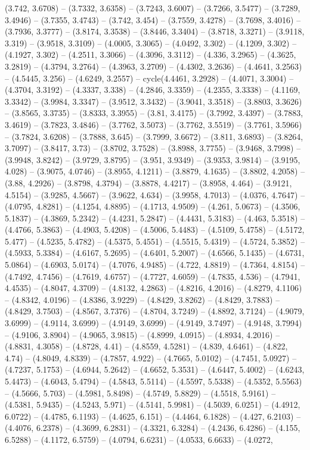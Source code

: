 (3.742, 3.6708) -- (3.7332, 3.6358) -- (3.7243, 3.6007) -- (3.7266, 3.5477) -- (3.7289, 3.4946) -- (3.7355, 3.4743) -- (3.742, 3.454) -- (3.7559, 3.4278) -- (3.7698, 3.4016) -- (3.7936, 3.3777) -- (3.8174, 3.3538) -- (3.8446, 3.3404) -- (3.8718, 3.3271) -- (3.9118, 3.319) -- (3.9518, 3.3109) -- (4.0005, 3.3065) -- (4.0492, 3.302) -- (4.1209, 3.302) -- (4.1927, 3.302) -- (4.2511, 3.3066) -- (4.3096, 3.3112) -- (4.336, 3.2965) -- (4.3625, 3.2819) -- (4.3794, 3.2764) -- (4.3963, 3.2709) -- (4.4302, 3.2636) -- (4.4641, 3.2563) -- (4.5445, 3.256) -- (4.6249, 3.2557) -- cycle(4.4461, 3.2928) -- (4.4071, 3.3004) -- (4.3704, 3.3192) -- (4.3337, 3.338) -- (4.2846, 3.3359) -- (4.2355, 3.3338) -- (4.1169, 3.3342) -- (3.9984, 3.3347) -- (3.9512, 3.3432) -- (3.9041, 3.3518) -- (3.8803, 3.3626) -- (3.8565, 3.3735) -- (3.8333, 3.3955) -- (3.81, 3.4175) -- (3.7992, 3.4397) -- (3.7883, 3.4619) -- (3.7823, 3.4846) -- (3.7762, 3.5073) -- (3.7762, 3.5519) -- (3.7761, 3.5966) -- (3.7824, 3.6208) -- (3.7888, 3.645) -- (3.7999, 3.6672) -- (3.811, 3.6893) -- (3.8264, 3.7097) -- (3.8417, 3.73) -- (3.8702, 3.7528) -- (3.8988, 3.7755) -- (3.9468, 3.7998) -- (3.9948, 3.8242) -- (3.9729, 3.8795) -- (3.951, 3.9349) -- (3.9353, 3.9814) -- (3.9195, 4.028) -- (3.9075, 4.0746) -- (3.8955, 4.1211) -- (3.8879, 4.1635) -- (3.8802, 4.2058) -- (3.88, 4.2926) -- (3.8798, 4.3794) -- (3.8878, 4.4217) -- (3.8958, 4.464) -- (3.9121, 4.5154) -- (3.9285, 4.5667) -- (3.9622, 4.634) -- (3.9958, 4.7013) -- (4.0376, 4.7647) -- (4.0795, 4.8281) -- (4.1254, 4.8895) -- (4.1713, 4.9509) -- (4.261, 5.0673) -- (4.3506, 5.1837) -- (4.3869, 5.2342) -- (4.4231, 5.2847) -- (4.4431, 5.3183) -- (4.463, 5.3518) -- (4.4766, 5.3863) -- (4.4903, 5.4208) -- (4.5006, 5.4483) -- (4.5109, 5.4758) -- (4.5172, 5.477) -- (4.5235, 5.4782) -- (4.5375, 5.4551) -- (4.5515, 5.4319) -- (4.5724, 5.3852) -- (4.5933, 5.3384) -- (4.6167, 5.2695) -- (4.6401, 5.2007) -- (4.6566, 5.1435) -- (4.6731, 5.0864) -- (4.6903, 5.0174) -- (4.7076, 4.9485) -- (4.722, 4.8819) -- (4.7364, 4.8154) -- (4.7492, 4.7456) -- (4.7619, 4.6757) -- (4.7727, 4.6059) -- (4.7835, 4.536) -- (4.7941, 4.4535) -- (4.8047, 4.3709) -- (4.8132, 4.2863) -- (4.8216, 4.2016) -- (4.8279, 4.1106) -- (4.8342, 4.0196) -- (4.8386, 3.9229) -- (4.8429, 3.8262) -- (4.8429, 3.7883) -- (4.8429, 3.7503) -- (4.8567, 3.7376) -- (4.8704, 3.7249) -- (4.8892, 3.7124) -- (4.9079, 3.6999) -- (4.9114, 3.6999) -- (4.9149, 3.6999) -- (4.9149, 3.7497) -- (4.9148, 3.7994) -- (4.9106, 3.8904) -- (4.9065, 3.9815) -- (4.8999, 4.0915) -- (4.8934, 4.2016) -- (4.8831, 4.3058) -- (4.8728, 4.41) -- (4.8559, 4.5281) -- (4.839, 4.6461) -- (4.822, 4.74) -- (4.8049, 4.8339) -- (4.7857, 4.922) -- (4.7665, 5.0102) -- (4.7451, 5.0927) -- (4.7237, 5.1753) -- (4.6944, 5.2642) -- (4.6652, 5.3531) -- (4.6447, 5.4002) -- (4.6243, 5.4473) -- (4.6043, 5.4794) -- (4.5843, 5.5114) -- (4.5597, 5.5338) -- (4.5352, 5.5563) -- (4.5666, 5.703) -- (4.5981, 5.8498) -- (4.5749, 5.8829) -- (4.5518, 5.9161) -- (4.5381, 5.9435) -- (4.5243, 5.971) -- (4.5141, 5.9981) -- (4.5039, 6.0251) -- (4.4912, 6.0722) -- (4.4785, 6.1193) -- (4.4625, 6.151) -- (4.4464, 6.1828) -- (4.427, 6.2103) -- (4.4076, 6.2378) -- (4.3699, 6.2831) -- (4.3321, 6.3284) -- (4.2436, 6.4286) -- (4.155, 6.5288) -- (4.1172, 6.5759) -- (4.0794, 6.6231) -- (4.0533, 6.6633) -- (4.0272, 
